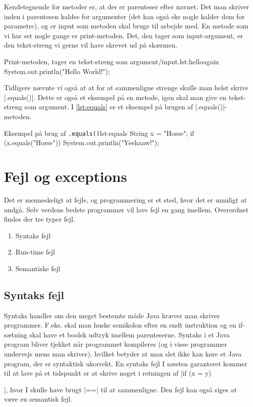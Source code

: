 {Kendetegnende for metoder er, at der er parenteser efter navnet. Det man skriver inden i parentesen kaldes for argumenter (det kan også ske nogle kalder dem for parametre), og er input som metoden skal bruge til arbejde med. En metode som vi har set nogle gange er print-metoden. Det, den tager som input-argument, er den tekst-streng vi gerne vil have skrevet ud på skærmen.

\begin{JavaCode}{Print-metoden, tager en tekst-streng som argument/input.}{lst:helloagain}
	System.out.println("Hello World!");
\end{JavaCode}

Tidligere nævnte vi også at at for at sammenligne strenge skulle man helst skrive \JavaInline|.equals()|. Dette er også et eksempel på en metode, igen skal man give en tekst-streng som argument. I \autoref{lst:equals} er et eksempel på brugen af \JavaInline|.equals()|-metoden.

\begin{JavaCode}{Eksempel på brug af \texttt{.equals()}}{lst:equals}
	String x = "Horse";
	if (x.equals("Horse")) {
		System.out.println("Yeehaaw!");
	}
\end{JavaCode}

\section{Fejl og exceptions}
Det er menneskeligt at fejle, og programmering er et sted, hvor det er umuligt at undgå. Selv verdens bedste programmør vil lave fejl en gang imellem. Overordnet findes der tre typer fejl.

\begin{enumerate}
	\item Syntaks fejl
	\item Run-time fejl
	\item Semantiske fejl
\end{enumerate}

\subsection{Syntaks fejl}
Syntaks handler om den meget bestemte måde Java kræver man skriver programmer. F.eks. skal man huske semikolon efter en endt instruktion og en if-sætning skal have et boolsk udtryk imellem parenteserne. Syntaks i et Java program bliver tjekket når programmet kompileres (og i visse programmer undervejs mens man skriver), hvilket betyder at man slet ikke kan køre et Java program, der er syntaktisk ukorrekt. En syntaks fejl I næsten garanteret kommer til at lave på et tidspunkt er at skrive noget i retningen af \JavaInline|if (x = y) {|, hvor I skulle have brugt \JavaInline|==| til at sammenligne. Den fejl kan også siges at være en semantisk fejl.

}}
